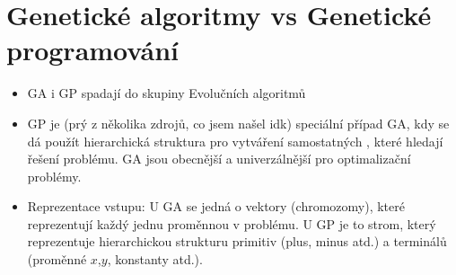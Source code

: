 \section{Genetické algoritmy vs Genetické programování}

\begin{itemize}
    \item GA i GP spadají do skupiny Evolučních algoritmů
    \item GP je (prý z několika zdrojů, co jsem našel idk) speciální případ GA, kdy se dá použít hierarchická struktura pro vytváření samostatných , které hledají řešení problému. GA jsou obecnější a univerzálnější pro optimalizační problémy.
    \item Reprezentace vstupu: U GA se jedná o vektory (chromozomy), které reprezentují každý jednu proměnnou v problému. U GP je to strom, který reprezentuje hierarchickou strukturu primitiv (plus, minus atd.) a terminálů (proměnné $x$,$y$, konstanty atd.).

\end{itemize}